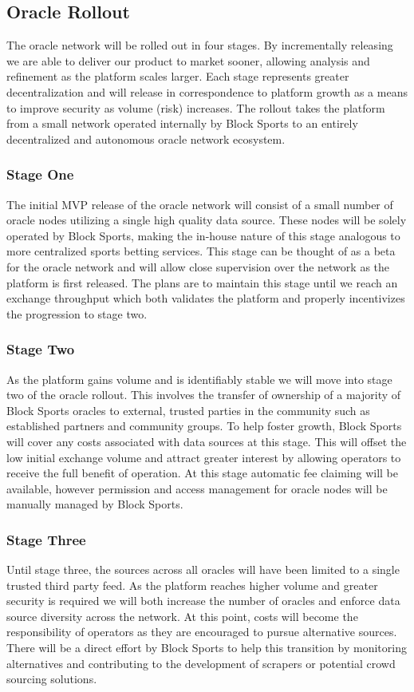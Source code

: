 \documentclass{article}
\begin{document}
	\subsection{Oracle Rollout} \label{oracle-rollout}
The oracle network will be rolled out in four stages. By incrementally releasing we are able to deliver our product to market sooner, allowing analysis and refinement as the platform scales larger. Each stage represents greater decentralization and will release in correspondence to platform growth as a means to improve security as volume (risk) increases. The rollout takes the platform from a small network operated internally by Block Sports to an entirely decentralized and autonomous oracle network ecosystem.

		\subsubsection{Stage One} \label{stage-one}
		The initial MVP release of the oracle network will consist of a small number of oracle nodes utilizing a single high quality data source. These nodes will be solely operated by Block Sports, making the in-house nature of this stage analogous to more centralized sports betting services. This stage can be thought of as a beta for the oracle network and will allow close supervision over the network as the platform is first released. The plans are to maintain this stage until we reach an exchange throughput which both validates the platform and properly incentivizes the progression to stage two.

		\subsubsection{Stage Two} \label{stage-two}
		As the platform gains volume and is identifiably stable we will move into stage two of the oracle rollout. This involves the transfer of ownership of a majority of Block Sports oracles to external, trusted parties in the community such as established partners and community groups. To help foster growth, Block Sports will cover any costs associated with data sources at this stage. This will offset the low initial exchange volume and attract greater interest by allowing operators to receive the full benefit of operation. At this stage automatic fee claiming will be available, however permission and access management for oracle nodes will be manually managed by Block Sports.

		\subsubsection{Stage Three} \label{stage-three}
		Until stage three, the sources across all oracles will have been limited to a single trusted third party feed. As the platform reaches higher volume and greater security is required we will both increase the number of oracles and enforce data source diversity across the network. At this point, costs will become the responsibility of operators as they are encouraged to pursue alternative sources. There will be a direct effort by Block Sports to help this transition by monitoring alternatives and contributing to the development of scrapers or potential crowd sourcing solutions.
\end{document}
